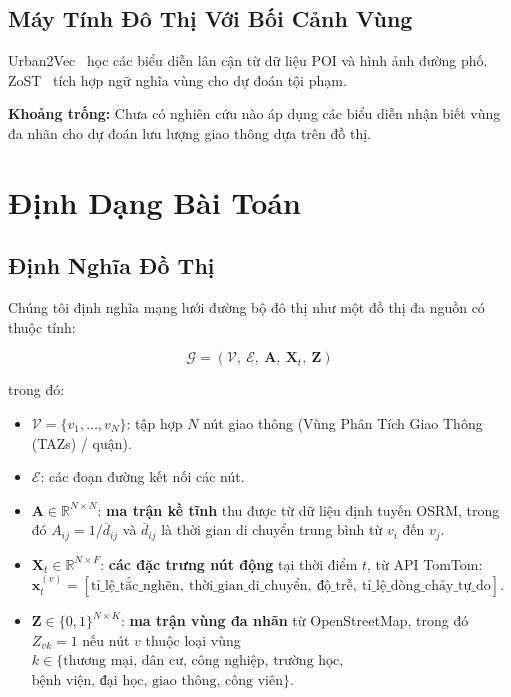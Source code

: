 \documentclass[12pt,a4paper]{article}
\begin{document}
\subsection{Máy Tính Đô Thị Với Bối Cảnh Vùng}
Urban2Vec~\cite{wang2020urban2vec} học các biểu diễn lân cận từ
dữ liệu POI và hình ảnh đường phố. ZoST~\cite{} tích hợp ngữ nghĩa vùng cho dự đoán tội phạm.

\textbf{Khoảng trống:} Chưa có nghiên cứu nào áp dụng các biểu diễn nhận biết vùng đa nhãn cho
dự đoán lưu lượng giao thông dựa trên đồ thị.

\section{Định Dạng Bài Toán}

\subsection{Định Nghĩa Đồ Thị}

Chúng tôi định nghĩa mạng lưới đường bộ đô thị như một đồ thị đa nguồn có thuộc tính:

\begin{equation}
\mathcal{G} = (\mathcal{V},\ \mathcal{E},\ \mathbf{A},\ \mathbf{X}_t,\ \mathbf{Z})
\end{equation}

trong đó:
\begin{itemize}
    \item $\mathcal{V} = \{v_1, \ldots, v_N\}$: tập hợp $N$ nút giao thông
          (Vùng Phân Tích Giao Thông (TAZs) / quận).
    \item $\mathcal{E}$: các đoạn đường kết nối các nút.
    \item $\mathbf{A} \in \mathbb{R}^{N \times N}$: \textbf{ma trận kề tĩnh}
          thu được từ dữ liệu định tuyến OSRM, trong đó
          $A_{ij} = 1/\overline{d}_{ij}$ và $\overline{d}_{ij}$ là
          thời gian di chuyển trung bình từ $v_i$ đến $v_j$.
    \item $\mathbf{X}_t \in \mathbb{R}^{N \times F}$: \textbf{các đặc trưng nút động}
          tại thời điểm $t$, từ API TomTom:
          $\mathbf{x}_t^{(v)} = [\text{tỉ\_lệ\_tắc\_nghẽn},\ \text{thời\_gian\_di\_chuyển},\
          \text{độ\_trễ},\ \text{tỉ\_lệ\_dòng\_chảy\_tự\_do}]$.
    \item $\mathbf{Z} \in \{0,1\}^{N \times K}$: \textbf{ma trận vùng đa nhãn}
          từ OpenStreetMap, trong đó $Z_{vk} = 1$ nếu nút $v$ thuộc loại vùng
          $k \in \{\text{thương mại, dân cư, công nghiệp, trường học,}$
          $\text{bệnh viện, đại học, giao thông, công viên}\}$.
\end{itemize}
\end{document}
